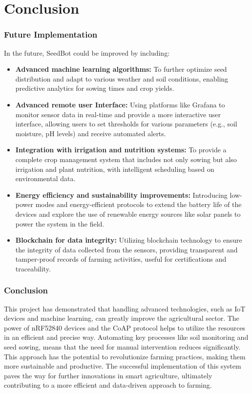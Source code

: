 \chapter{Conclusion}

\subsection{Future Implementation}

In the future, SeedBot could be improved by including:

\begin{itemize}
    \item \textbf{Advanced machine learning algorithms:} To further optimize seed distribution and adapt to various weather and soil conditions, enabling predictive analytics for sowing times and crop yields.
    \item \textbf{Advanced remote user Interface:} Using platforms like Grafana to monitor sensor data in real-time and provide a more interactive user interface, allowing users to set thresholds for various parameters (e.g., soil moisture, pH levels) and receive automated alerts.
    \item \textbf{Integration with irrigation and nutrition systems:} To provide a complete crop management system that includes not only sowing but also irrigation and plant nutrition, with intelligent scheduling based on environmental data.
    \item \textbf{Energy efficiency and sustainability improvements:} Introducing low-power modes and energy-efficient protocols to extend the battery life of the devices and explore the use of renewable energy sources like solar panels to power the system in the field.
    \item \textbf{Blockchain for data integrity:} Utilizing blockchain technology to ensure the integrity of data collected from the sensors, providing transparent and tamper-proof records of farming activities, useful for certifications and traceability.
\end{itemize}

\subsection{Conclusion}

This project has demonstrated that handling advanced technologies, such as IoT devices and machine learning, can greatly improve the agricultural sector. The power of nRF52840 devices and the CoAP protocol helps to utilize the resources in an efficient and precise way.
Automating key processes like soil monitoring and seed sowing, means that the need for manual intervention reduces significantly. This approach has the potential to revolutionize farming practices, making them more sustainable and productive. The successful implementation of this system paves the way for further innovations in smart agriculture, ultimately contributing to a more efficient and data-driven approach to farming.